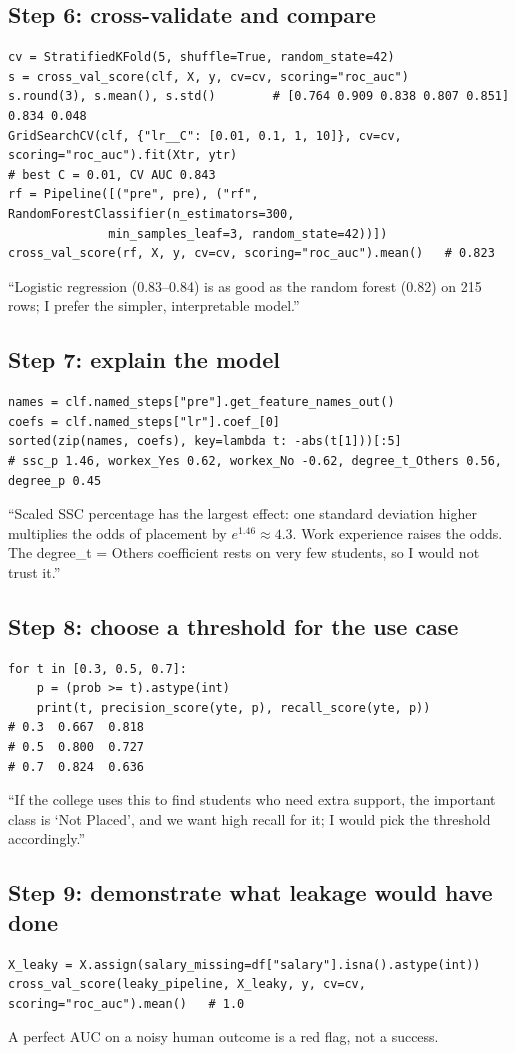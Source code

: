 \subsection{Step 6: cross-validate and compare}
\begin{lstlisting}
cv = StratifiedKFold(5, shuffle=True, random_state=42)
s = cross_val_score(clf, X, y, cv=cv, scoring="roc_auc")
s.round(3), s.mean(), s.std()        # [0.764 0.909 0.838 0.807 0.851] 0.834 0.048
GridSearchCV(clf, {"lr__C": [0.01, 0.1, 1, 10]}, cv=cv, scoring="roc_auc").fit(Xtr, ytr)
# best C = 0.01, CV AUC 0.843
rf = Pipeline([("pre", pre), ("rf", RandomForestClassifier(n_estimators=300,
              min_samples_leaf=3, random_state=42))])
cross_val_score(rf, X, y, cv=cv, scoring="roc_auc").mean()   # 0.823
\end{lstlisting}
``Logistic regression (0.83--0.84) is as good as the random forest (0.82) on 215 rows; I prefer the simpler, interpretable model.''

\subsection{Step 7: explain the model}
\begin{lstlisting}
names = clf.named_steps["pre"].get_feature_names_out()
coefs = clf.named_steps["lr"].coef_[0]
sorted(zip(names, coefs), key=lambda t: -abs(t[1]))[:5]
# ssc_p 1.46, workex_Yes 0.62, workex_No -0.62, degree_t_Others 0.56, degree_p 0.45
\end{lstlisting}
``Scaled SSC percentage has the largest effect: one standard deviation higher multiplies the odds of placement by $e^{1.46}\approx4.3$. Work experience raises the odds. The
degree\_t = Others coefficient rests on very few students, so I would not trust it.''

\subsection{Step 8: choose a threshold for the use case}
\begin{lstlisting}
for t in [0.3, 0.5, 0.7]:
    p = (prob >= t).astype(int)
    print(t, precision_score(yte, p), recall_score(yte, p))
# 0.3  0.667  0.818
# 0.5  0.800  0.727
# 0.7  0.824  0.636
\end{lstlisting}
``If the college uses this to find students who need extra support, the important class is `Not Placed', and we want high recall for it; I would pick the threshold accordingly.''

\subsection{Step 9: demonstrate what leakage would have done}
\begin{lstlisting}
X_leaky = X.assign(salary_missing=df["salary"].isna().astype(int))
cross_val_score(leaky_pipeline, X_leaky, y, cv=cv, scoring="roc_auc").mean()   # 1.0
\end{lstlisting}
A perfect AUC on a noisy human outcome is a red flag, not a success.

